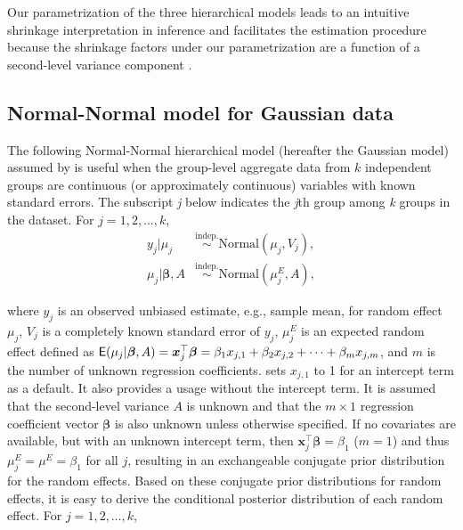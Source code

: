 \documentclass[article]{jss}
\begin{document}
Our parametrization of the three hierarchical models leads to an intuitive shrinkage interpretation in inference and  facilitates the estimation procedure because the shrinkage factors under our parametrization are a function of  a second-level variance component \citep{morris1983natural}.
 
\subsection[Normal-Normal]{Normal-Normal model for Gaussian data}
The following Normal-Normal hierarchical model (hereafter the Gaussian model) assumed by  is useful when the group-level aggregate data from $k$ independent  groups are continuous (or approximately continuous) variables with known standard errors. The subscript \emph{j} below indicates the \emph{j}th group among \emph{k} groups in the dataset. For $j=1, 2, \ldots, k$, 
\begin{align}
y_{j}\vert \mu_{j} & \stackrel{\textrm{indep.}}{\sim} \textrm{Normal}(\mu_{j}, V_{j}),\label{normalobs}\\
\mu_{j}\vert \boldsymbol{\beta}, A & \stackrel{\textrm{indep.}}{\sim} \textrm{Normal}(\mu^E_{j}, A),\label{normalprior}
\end{align}


where $y_j$ is an observed unbiased estimate, e.g., sample mean, for random effect $\mu_j$, $V_{j}$ is a completely known standard error of $y_j$, $\mu^E_{j}$ is an expected random effect defined as $\mathsf{E}(\mu_j\vert \boldsymbol{\beta}, A) = \boldsymbol{x}_j^\top \boldsymbol{\beta}=\beta_{1}x_{j, 1}+\beta_{2}x_{j, 2} + \cdots + \beta_{m}x_{j, m}$, and $m$ is the number of unknown regression coefficients.  sets $x_{j, 1}$ to 1 for an intercept term as a default. It also provides a usage without the intercept term.  It is assumed that the second-level variance $A$ is unknown and that the $m\times1$ regression coefficient vector $\boldsymbol{\beta}$ is also unknown unless otherwise specified. If no covariates are available, but with an unknown intercept term, then $\boldsymbol{x}_j^\top \boldsymbol{\beta}=\beta_1$ ($m=1$) and thus $\mu^E_{j}=\mu^E=\beta_1$ for all $j$, resulting in an exchangeable conjugate prior distribution for the random effects.  Based on these conjugate prior distributions for random effects, it is easy to derive the conditional posterior distribution of each random effect. For $j=1, 2, \ldots, k$,
\end{document}
